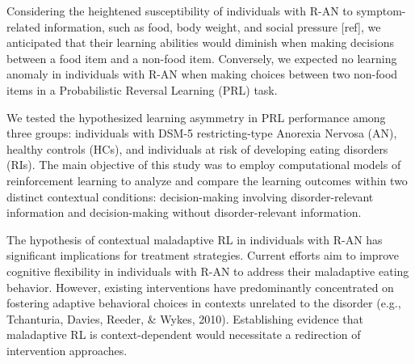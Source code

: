\documentclass[
  man,floatsintext]{apa6}
\begin{document}
Considering the heightened susceptibility of individuals with R-AN to symptom-related information, such as food, body weight, and social pressure {[}ref{]}, we anticipated that their learning abilities would diminish when making decisions between a food item and a non-food item. Conversely, we expected no learning anomaly in individuals with R-AN when making choices between two non-food items in a Probabilistic Reversal Learning (PRL) task.

We tested the hypothesized learning asymmetry in PRL performance among three groups: individuals with DSM-5 restricting-type Anorexia Nervosa (AN), healthy controls (HCs), and individuals at risk of developing eating disorders (RIs). The main objective of this study was to employ computational models of reinforcement learning to analyze and compare the learning outcomes within two distinct contextual conditions: decision-making involving disorder-relevant information and decision-making without disorder-relevant information.

The hypothesis of contextual maladaptive RL in individuals with R-AN has significant implications for treatment strategies. Current efforts aim to improve cognitive flexibility in individuals with R-AN to address their maladaptive eating behavior. However, existing interventions have predominantly concentrated on fostering adaptive behavioral choices in contexts unrelated to the disorder (e.g., Tchanturia, Davies, Reeder, \& Wykes, 2010). Establishing evidence that maladaptive RL is context-dependent would necessitate a redirection of intervention approaches.
\end{document}
